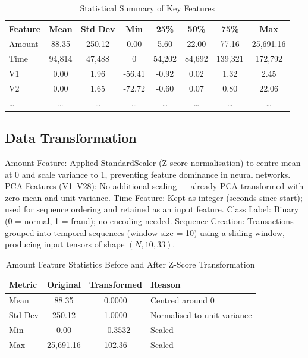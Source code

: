 \begin{table}[h]
\centering
\caption{Statistical Summary of Key Features}
\label{tab:stat_summary}
\begin{tabular}{|l|c|c|c|c|c|c|c|}
\hline
\textbf{Feature} & \textbf{Mean} & \textbf{Std Dev} & \textbf{Min} & \textbf{25\%} & \textbf{50\%} & \textbf{75\%} & \textbf{Max} \\
\hline
Amount & 88.35 & 250.12 & 0.00 & 5.60 & 22.00 & 77.16 & 25,691.16 \\
\hline
Time & 94,814 & 47,488 & 0 & 54,202 & 84,692 & 139,321 & 172,792 \\
\hline
V1 & 0.00 & 1.96 & -56.41 & -0.92 & 0.02 & 1.32 & 2.45 \\
\hline
V2 & 0.00 & 1.65 & -72.72 & -0.60 & 0.07 & 0.80 & 22.06 \\
\hline
\ldots & \ldots & \ldots & \ldots & \ldots & \ldots & \ldots & \ldots \\
\hline
\end{tabular}
\end{table}

\subsection{Data Transformation}

Amount Feature: Applied StandardScaler (Z-score normalisation) to centre mean at 0 and scale variance to 1, preventing feature dominance in neural networks.
PCA Features (V1–V28): No additional scaling — already PCA-transformed with zero mean and unit variance.
Time Feature: Kept as integer (seconds since start); used for sequence ordering and retained as an input feature.
Class Label: Binary (0 = normal, 1 = fraud); no encoding needed.
Sequence Creation: Transactions grouped into temporal sequences (window size = 10) using a sliding window, producing input tensors of shape $(N, 10, 33)$.

\begin{table}[h]
\centering
\caption{Amount Feature Statistics Before and After Z-Score Transformation}
\label{tab:result_statistics}
\begin{tabular}{|l|c|c|p{5cm}|}
\hline
\textbf{Metric} & \textbf{Original} & \textbf{Transformed} & \textbf{Reason} \\
\hline
Mean & 88.35 & 0.0000 & Centred around 0 \\
\hline
Std Dev & 250.12 & 1.0000 & Normalised to unit variance \\
\hline
Min & 0.00 & $-0.3532$ & Scaled \\
\hline
Max & 25,691.16 & 102.36 & Scaled \\
\hline
\end{tabular}
\end{table}

